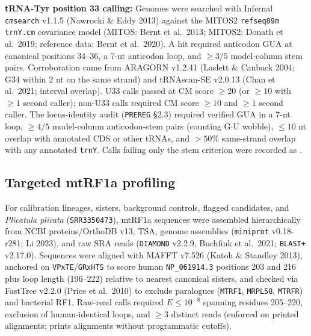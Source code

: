 \documentclass[11pt, a4paper]{article}
\begin{document}
\textbf{tRNA-Tyr position 33 calling:} Genomes were searched with Infernal \texttt{cmsearch} v1.1.5 (Nawrocki \& Eddy 2013) against the MITOS2 \texttt{refseq89m} \texttt{trnY.cm} covariance model (MITOS: Bernt et al.\ 2013; MITOS2: Donath et al.\ 2019; reference data: Bernt et al.\ 2020). A hit required anticodon GUA at canonical positions 34--36, a 7-nt anticodon loop, and $\ge 3/5$ model-column stem pairs. Corroboration came from ARAGORN v1.2.41 (Laslett \& Canback 2004; G34 within 2 nt on the same strand) and tRNAscan-SE v2.0.13 (Chan et al.\ 2021; interval overlap). U33 calls passed at CM score $\ge 20$ (or $\ge 10$ with $\ge 1$ second caller); non-U33 calls required CM score $\ge 10$ and $\ge 1$ second caller. The locus-identity audit (\texttt{PREREG} \S 2.3) required verified GUA in a 7-nt loop, $\ge 4/5$ model-column anticodon-stem pairs (counting G$\cdot$U wobble), $\le 10$ nt overlap with annotated CDS or other tRNAs, and $>50\%$ same-strand overlap with any annotated \texttt{trnY}. Calls failing only the stem criterion were recorded as .

\subsection{Targeted mtRF1a profiling}
For calibration lineages, sisters, background controls, flagged candidates, and \textit{Plicatula plicata} (\texttt{SRR3350473}), mtRF1a sequences were assembled hierarchically from NCBI proteins/OrthoDB v13, TSA, genome assemblies (\texttt{miniprot} v0.18-r281; Li 2023), and raw SRA reads (\texttt{DIAMOND} v2.2.9, Buchfink et al.\ 2021; \texttt{BLAST+} v2.17.0). Sequences were aligned with MAFFT v7.526 (Katoh \& Standley 2013), anchored on \texttt{VPxTE}/\texttt{GRxHTS} to score human \texttt{NP\_061914.3} positions 203 and 216 plus loop length (196--222) relative to nearest canonical sisters, and checked via FastTree v2.2.0 (Price et al.\ 2010) to exclude paralogues (\texttt{MTRF1}, \texttt{MRPL58}, \texttt{MTRFR}) and bacterial RF1. Raw-read calls required $E \le 10^{-8}$ spanning residues 205--220, exclusion of human-identical loops, and $\ge 3$ distinct reads (enforced on printed alignments;  prints alignments without programmatic cutoffs).
\end{document}
